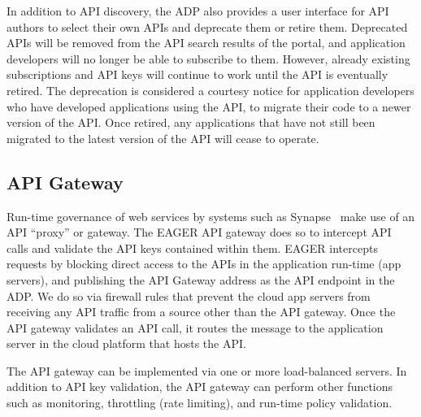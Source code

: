 In addition to API discovery, the ADP also provides a user
interface for API authors to select their own APIs and deprecate them or
retire them. Deprecated APIs will be removed from the API search
results of the portal, and application developers will no longer be able to 
subscribe to them. However, already existing subscriptions and API keys will continue
to work until the API is eventually retired. 
The deprecation is considered a courtesy notice for application developers
who have developed applications using the API, to migrate their code to a newer version
of the API. 
Once retired, any applications that have
not still been migrated to the latest version of the API will cease to operate.

\subsection{API Gateway} 
Run-time governance of web services by systems such as
Synapse~\cite{synapse} make use of an API ``proxy'' or gateway.
The EAGER API gateway does so to intercept API calls and validate 
the API keys contained within them.
EAGER intercepts requests by blocking direct access to the APIs in the
application run-time (app servers), and publishing the API Gateway address as
the API endpoint in the ADP. We do so via firewall rules
that prevent the cloud app servers from receiving any
API traffic from a source other than the API gateway. Once the API gateway validates
an API call, it routes the message to the
application server in the cloud platform that hosts the API.

The API gateway can be implemented via one or more load-balanced servers.
In addition to API key validation, the API gateway can perform other
functions such as monitoring, throttling (rate limiting), 
and run-time policy validation. 
